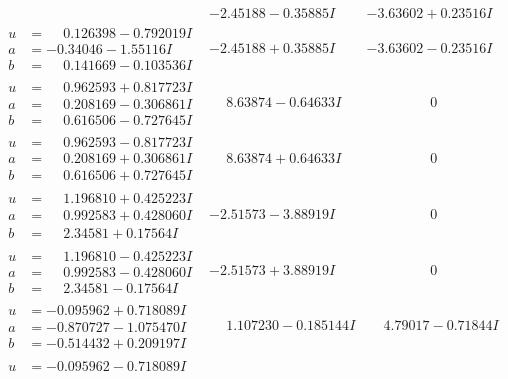 \documentclass[1p]{elsarticle_modified}
\theoremstyle{definition}
\begin{document}
$$\begin{array}{c|c|c}
 & -2.45188 - 0.35885 I & -3.63602 + 0.23516 I \\ \hline\begin{aligned}
u &= \phantom{-}0.126398 - 0.792019 I \\
a &= -0.34046 - 1.55116 I \\
b &= \phantom{-}0.141669 - 0.103536 I\end{aligned}
 & -2.45188 + 0.35885 I & -3.63602 - 0.23516 I \\ \hline\begin{aligned}
u &= \phantom{-}0.962593 + 0.817723 I \\
a &= \phantom{-}0.208169 - 0.306861 I \\
b &= \phantom{-}0.616506 - 0.727645 I\end{aligned}
 & \phantom{-}8.63874 - 0.64633 I & \phantom{-0.000000 } 0 \\ \hline\begin{aligned}
u &= \phantom{-}0.962593 - 0.817723 I \\
a &= \phantom{-}0.208169 + 0.306861 I \\
b &= \phantom{-}0.616506 + 0.727645 I\end{aligned}
 & \phantom{-}8.63874 + 0.64633 I & \phantom{-0.000000 } 0 \\ \hline\begin{aligned}
u &= \phantom{-}1.196810 + 0.425223 I \\
a &= \phantom{-}0.992583 + 0.428060 I \\
b &= \phantom{-}2.34581 + 0.17564 I\end{aligned}
 & -2.51573 - 3.88919 I & \phantom{-0.000000 } 0 \\ \hline\begin{aligned}
u &= \phantom{-}1.196810 - 0.425223 I \\
a &= \phantom{-}0.992583 - 0.428060 I \\
b &= \phantom{-}2.34581 - 0.17564 I\end{aligned}
 & -2.51573 + 3.88919 I & \phantom{-0.000000 } 0 \\ \hline\begin{aligned}
u &= -0.095962 + 0.718089 I \\
a &= -0.870727 - 1.075470 I \\
b &= -0.514432 + 0.209197 I\end{aligned}
 & \phantom{-}1.107230 - 0.185144 I & \phantom{-}4.79017 - 0.71844 I \\ \hline\begin{aligned}
u &= -0.095962 - 0.718089 I \\

\end{aligned}
\end{array}$$
\end{document}
